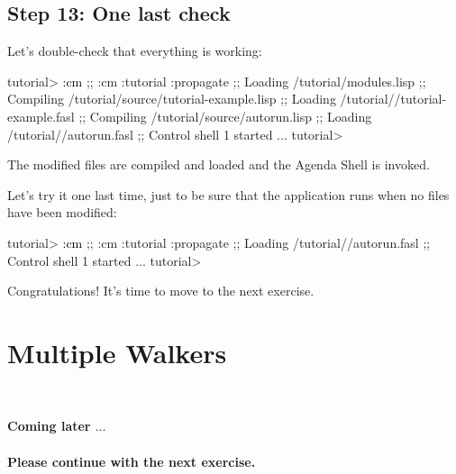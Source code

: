 \documentclass[10pt,twoside,english,pdftex]{article}
\begin{document}
\subsection*{Step 13: One last check}

Let's double-check that everything is working:
%
\W\supp
\begin{example}
\textcolor{darkergray}{%
  tutorial> \textcolor{black}{:cm}
  ;; :cm :tutorial :propagate
  ;; Loading /tutorial/modules.lisp
  ;; Compiling /tutorial/source/tutorial-example.lisp
  ;; Loading /tutorial//tutorial-example.fasl
  ;; Compiling /tutorial/source/autorun.lisp
  ;; Loading /tutorial//autorun.fasl
  ;; Control shell 1 started
     ...
  tutorial>}
\end{example}
%
The modified files are compiled and loaded and the Agenda Shell is invoked.

Let's try it one last time, just to be sure that the application runs when no
files have been modified:
%
\W\supp
\begin{example}
\textcolor{darkergray}{%
  tutorial> \textcolor{black}{:cm}
  ;; :cm :tutorial :propagate
  ;; Loading /tutorial//autorun.fasl
  ;; Control shell 1 started
     ...
  tutorial>}
\end{example}

Congratulations!  It's time to move to the next exercise.


\T\markright{}%
\T\pagestyle{plain}
\T\cleardoublepage
\W{}
\T\pagestyle{fancy}
\T\thispagestyle{fancybottom}
\T\renewcommand{\headrulewidth}{0pt}
\section{Multiple Walkers}
\label{sec:multiple-walkers}%

\T\medskip
\T\fndocrule\\
\T\begin{center}
\textcolor{darkergray}{\textsf{\textbf{Coming later $\ldots$\\~\\ 
 Please continue with the next exercise.}}}
\T\end{center}
\T\fndocrule

\end{document}
